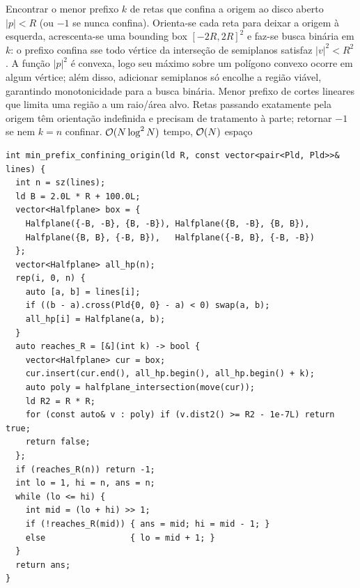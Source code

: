\algobox
  {Encontrar o menor prefixo $k$ de retas que confina a origem ao disco aberto $|p| < R$ (ou $-1$ se nunca confina).}
  {Orienta-se cada reta para deixar a origem à esquerda, acrescenta-se uma bounding box $[-2R, 2R]^2$ e faz-se busca binária em $k$: o prefixo confina sse todo vértice da interseção de semiplanos satisfaz $|v|^2 < R^2$.}
  {A função $|p|^2$ é convexa, logo seu máximo sobre um polígono convexo ocorre em algum vértice; além disso, adicionar semiplanos só encolhe a região viável, garantindo monotonicidade para a busca binária.}
  {Menor prefixo de cortes lineares que limita uma região a um raio/área alvo.}
  {Retas passando exatamente pela origem têm orientação indefinida e precisam de tratamento à parte; retornar $-1$ se nem $k = n$ confinar.}
  {$\mathcal{O}(N \log^2 N)$ tempo, $\mathcal{O}(N)$ espaço}

\begin{lstlisting}
int min_prefix_confining_origin(ld R, const vector<pair<Pld, Pld>>& lines) {
  int n = sz(lines);
  ld B = 2.0L * R + 100.0L;
  vector<Halfplane> box = {
    Halfplane({-B, -B}, {B, -B}), Halfplane({B, -B}, {B, B}),
    Halfplane({B, B}, {-B, B}),   Halfplane({-B, B}, {-B, -B})
  };
  vector<Halfplane> all_hp(n);
  rep(i, 0, n) {
    auto [a, b] = lines[i];
    if ((b - a).cross(Pld{0, 0} - a) < 0) swap(a, b);
    all_hp[i] = Halfplane(a, b);
  }
  auto reaches_R = [&](int k) -> bool {
    vector<Halfplane> cur = box;
    cur.insert(cur.end(), all_hp.begin(), all_hp.begin() + k);
    auto poly = halfplane_intersection(move(cur));
    ld R2 = R * R;
    for (const auto& v : poly) if (v.dist2() >= R2 - 1e-7L) return true;
    return false;
  };
  if (reaches_R(n)) return -1;
  int lo = 1, hi = n, ans = n;
  while (lo <= hi) {
    int mid = (lo + hi) >> 1;
    if (!reaches_R(mid)) { ans = mid; hi = mid - 1; }
    else                 { lo = mid + 1; }
  }
  return ans;
}
\end{lstlisting}

